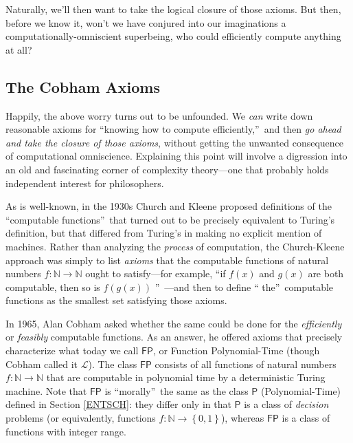 \documentclass[12pt,onecolumn]{article}%
\begin{document}
\noindent Naturally, we'll then want to take the logical closure of those
axioms. But then, before we know it, won't we have conjured into our
imaginations a computationally-omniscient superbeing, who could efficiently
compute anything at all?

\subsection{The Cobham Axioms\label{COBHAM}}

Happily, the above worry turns out to be unfounded. We \textit{can} write
down reasonable axioms for \textquotedblleft knowing how to compute
efficiently,\textquotedblright\  and then \textit{go ahead and take the closure
of those axioms}, without getting the unwanted consequence of computational
omniscience. Explaining this point will involve a digression into an old and
fascinating corner of complexity theory---one that probably holds independent
interest for philosophers.

As is well-known, in the 1930s Church and Kleene proposed definitions of the
\textquotedblleft computable functions\textquotedblright\  that turned out to
be precisely equivalent to Turing's definition, but that differed from
Turing's in making no explicit mention of machines. Rather than analyzing
the \textit{process} of computation, the Church-Kleene approach was simply to
list \textit{axioms} that the computable functions of natural numbers
$f:\mathbb{N}\rightarrow\mathbb{N}$ ought to satisfy---for example,
\textquotedblleft if $f\left(  x\right)  $ and $g\left(  x\right)  $ are both
computable, then so is $f\left(  g\left(  x\right)  \right)  $%
\textquotedblright\ ---and then to define \textquotedblleft
the\textquotedblright\  computable functions as the smallest set satisfying
those axioms.

In 1965, Alan Cobham \cite{cobham} asked whether the same could be done for
the \textit{efficiently} or \textit{feasibly} computable functions. As an
answer, he offered axioms that precisely characterize what today we call
$\mathsf{FP}$, or Function Polynomial-Time (though Cobham called it
$\mathcal{L}$). The class $\mathsf{FP}$ consists of all functions of
natural numbers $f:\mathbb{N}\rightarrow\mathbb{N}$ that are computable in
polynomial time by a deterministic Turing machine. Note that $\mathsf{FP}%
$ is \textquotedblleft morally\textquotedblright\  the same as the class
$\mathsf{P}$ (Polynomial-Time) defined in Section \ref{ENTSCH}: they differ
only in that $\mathsf{P}$ is a class of \textit{decision} problems (or
equivalently, functions $f:\mathbb{N}\rightarrow\left\{  0,1\right\}  $),
whereas $\mathsf{FP}$ is a class of functions with integer range.
\end{document}
